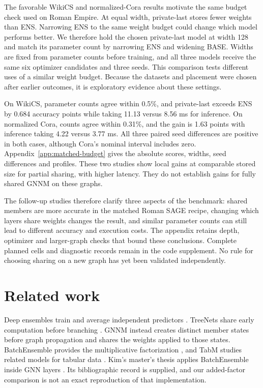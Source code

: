 \documentclass{article}
\begin{document}
The favorable WikiCS and normalized-Cora results motivate the same budget check used on Roman Empire. At equal width, private-last stores fewer weights than ENS. Narrowing ENS to the same weight budget could change which model performs better. We therefore hold the chosen private-last model at width 128 and match its parameter count by narrowing ENS and widening BASE. Widths are fixed from parameter counts before training, and all three models receive the same six optimizer candidates and three seeds. This comparison tests different uses of a similar weight budget. Because the datasets and placement were chosen after earlier outcomes, it is exploratory evidence about these settings.

On WikiCS, parameter counts agree within 0.5\%, and private-last exceeds ENS by 0.684 accuracy points while taking 11.13 versus 8.56 ms for inference. On normalized Cora, counts agree within 0.31\%, and the gain is 1.63 points with inference taking 4.22 versus 3.77 ms. All three paired seed differences are positive in both cases, although Cora's nominal interval includes zero. Appendix~\ref{app:matched-budget} gives the absolute scores, widths, seed differences and profiles. These two studies show local gains at comparable stored size for partial sharing, with higher latency. They do not establish gains for fully shared GNNM on these graphs.

The follow-up studies therefore clarify three aspects of the benchmark: shared members are more accurate in the matched Roman SAGE recipe, changing which layers share weights changes the result, and similar parameter counts can still lead to different accuracy and execution costs. The appendix retains depth, optimizer and larger-graph checks that bound these conclusions. Complete planned cells and diagnostic records remain in the code supplement. No rule for choosing sharing on a new graph has yet been validated independently.

\section{Related work}
Deep ensembles train and average independent predictors \citep{lakshminarayanan2017simple}. TreeNets share early computation before branching \citep{lee2015heads}. GNNM instead creates distinct member states before graph propagation and shares the weights applied to those states. BatchEnsemble provides the multiplicative factorization \citep{wen2020batchensemble}, and TabM studies related models for tabular data \citep{gorishniy2025tabm}. Kim's master's thesis applies BatchEnsemble inside GNN layers \citep{kim2023efficient}. Its bibliographic record is supplied, and our added-factor comparison is not an exact reproduction of that implementation.
\end{document}
